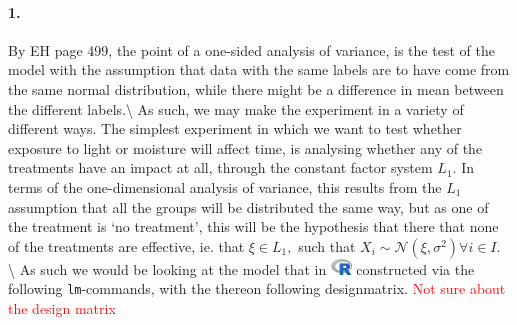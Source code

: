 \documentclass[
]{article}
\newenvironment{Shaded}{\begin{snugshade}}{\end{snugshade}}
\newcommand{\DataTypeTok}[1]{\textcolor[rgb]{0.13,0.29,0.53}{#1}}
\newcommand{\DecValTok}[1]{\textcolor[rgb]{0.00,0.00,0.81}{#1}}
\newcommand{\KeywordTok}[1]{\textcolor[rgb]{0.13,0.29,0.53}{\textbf{#1}}}
\newcommand{\NormalTok}[1]{#1}
\newcommand{\OperatorTok}[1]{\textcolor[rgb]{0.81,0.36,0.00}{\textbf{#1}}}
\newcommand{\StringTok}[1]{\textcolor[rgb]{0.31,0.60,0.02}{#1}}
\begin{document}
\hypertarget{section-81}{%
\paragraph{\texorpdfstring{\textbf{1.}}{1.}}\label{section-81}}

By EH page 499, the point of a one-sided analysis of variance, is the
test of the model with the assumption that data with the same labels are
to have come from the same normal distribution, while there might be a
difference in mean between the different labels.\textbackslash{} As
such, we may make the experiment in a variety of different ways. The
simplest experiment in which we want to test whether exposure to light
or moisture will affect time, is analysing whether any of the treatments
have an impact at all, through the constant factor system \(L_1.\) In
terms of the one-dimensional analysis of variance, this results from the
\(L_1\) assumption that all the groups will be distributed the same way,
but as one of the treatment is `no treatment', this will be the
hypothesis that there that none of the treatments are effective, ie.
that \(\xi\in L_1,\) such that
\(X_i\sim\mathcal{N}\left({{\xi},{\sigma^2}}\right) \forall i\in I.\)
\textbackslash{} As such we would be looking at the model that in
\includegraphics[width=\textwidth,height=0.16667in]{R_logo.png}
constructed via the following \texttt{lm}-commands, with the thereon
following designmatrix.
\textcolor{red}{{Not sure about the design matrix}}

\begin{Shaded}
\end{Shaded}
\end{document}
